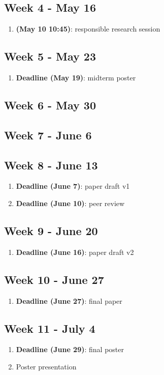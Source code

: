\documentclass[english]{article}
\begin{document}
\subsection*{Week 4 - May 16}
\begin{enumerate}
\item \textbf{(May 10 10:45)}: responsible research session
\end{enumerate}

\subsection*{Week 5 - May 23}
\begin{enumerate}
\item \textbf{Deadline (May 19)}: midterm poster
\end{enumerate}

\subsection*{Week 6 - May 30}

\subsection*{Week 7 - June 6}

\subsection*{Week 8 - June 13}
\begin{enumerate}
\item \textbf{Deadline (June 7)}: paper draft v1
\item \textbf{Deadline (June 10)}: peer review
\end{enumerate}

\subsection*{Week 9 - June 20}
\begin{enumerate}
\item \textbf{Deadline (June 16)}: paper draft v2
\end{enumerate}

\subsection*{Week 10 - June 27}
\begin{enumerate}
\item \textbf{Deadline (June 27)}: final paper
\end{enumerate}

\subsection*{Week 11 - July 4}
\begin{enumerate}
\item \textbf{Deadline (June 29)}: final poster
\item Poster presentation
\end{enumerate}




\end{document}
